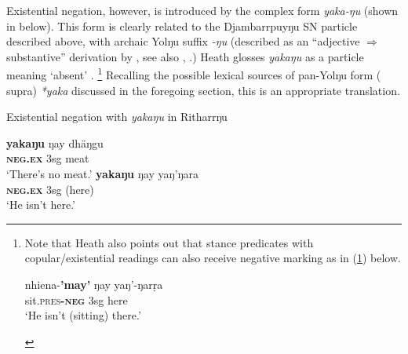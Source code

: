 \documentclass[output=paper,draft,draftmode,colorlinks,citecolor=brown]{langscibook}
\begin{document}
Existential negation, however, is introduced by the complex form
\textit{yaka-ŋu} (shown in  below). This
form is clearly related to the Djambarrpuyŋu SN particle
described above, with archaic Yolŋu suffix {\textit{-ŋu}} (described as an
``adjective $\Rightarrow$ substantive'' derivation by
\citealt[34]{Schebeck2001}, see also \citealt[174ff]{Wilkinson1991},
\citealt[24]{Heath1980}.) Heath glosses \textit{yakaŋu} as a particle
meaning `absent' \citeyearpar[102]{Heath1980}.%
%
\footnote{Note that Heath also points out that stance predicates with
copular\slash existential readings can also receive negative marking as in (\ref{ex:austr-exist-neg-rith-fn}) below. 
    \begin{exe}\label{ex:austr-exist-neg-rith-fn}
        \gll nhiena-\textbf{'may'} ŋay yaŋ'-ŋarṛa\\
	sit\textsc{.pres\textbf{-neg}} 3sg here\\
	\glt `He isn't (sitting) there.' \end{exe}
}
Recalling the possible lexical sources of pan-Yolŋu form ( supra) \textit{*yaka} discussed in the foregoing section, this is an appropriate translation.

\begin{exe}\ex\label{ex:austr-exist-neg-rith} 
    Existential negation with {\em yakaŋu} in Ritharrŋu
    \begin{xlist}
\ex\gll \textbf{yakaŋu} ŋay dhäŋgu\\
\textsc{\textbf{neg.ex}} 3sg meat\\
\glt `There's no meat.'
%
\ex\label{ex:austr-exist-neg-rith-here}
        \gll \textbf{yakaŋu} ŋay {\op}yaŋ'ŋara{\cp}\\
\textsc{\textbf{neg.ex}} 3sg (here)\\
\glt `He isn't here.'  {\citep[102]{Heath1980}}
    \end{xlist}\end{exe}
\end{document}
